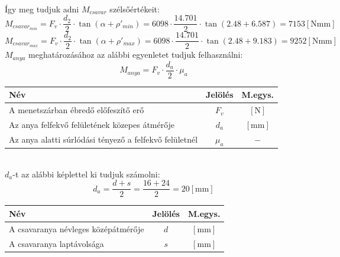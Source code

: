 \documentclass[10pt, a4paper]{article}
\newcommand{\n}{\mathrm{\left[N\right]}}
\newcommand{\mm}{\mathrm{\left[mm\right]}}
\newcommand{\nmm}{\mathrm{\left[Nmm\right]}}
\begin{document}
			\renewcommand{\arraystretch}{1}\\
	\newpage
	Így meg tudjuk adni $M_{csavar}$ szélsőértékeit:
	\begin{equation}
			M_{csavar_{min}} = F_v \cdot \dfrac{d_2}{2} \cdot \tan(\alpha + \rho'_{min}) = 6098 \cdot \dfrac{14.701}{2} \cdot \tan(2.48 + 6.587) = 7153 \nmm\tag{5.1}
	\end{equation}
	\begin{equation}
			M_{csavar_{max}} = F_v \cdot \dfrac{d_2}{2} \cdot \tan(\alpha + \rho'_{max}) = 6098 \cdot \dfrac{14.701}{2} \cdot \tan(2.48 + 9.183) = 9252 \nmm\tag{5.1} \label{Mcsavar}
	\end{equation}
	$M_{anya}$ meghatározásához az alábbi egyenletet tudjuk felhasználni:
	\begin{equation}
		M_{anya} = F_v \cdot \dfrac{d_a}{2} \cdot \mu_a \tag{5.2}
	\end{equation}
	\vspace{-20pt}
		\renewcommand{\arraystretch}{1.4}
							\begin{table}[!h]
								\centering
								\begin{tabular}{l|c|c}
									\textbf{Név}                              & \textbf{Jelölés} & \textbf{M.egys.} \\ \hline
									A menetszárban ébredő előfeszítő erő                     & $F_v$                & $\n$          \\
									Az anya felfekvő felületének közepes átmérője          & $d_a$                & $\mm$			 \\
									Az anya alatti súrlódási tényező a felfekvő felületnél           & $\mu_a$                & $-$			 	       
								\end{tabular}
							\end{table}
		\renewcommand{\arraystretch}{1}\\
	$d_a$-t az alábbi képlettel ki tudjuk számolni:
	\begin{equation}
		d_a = \dfrac{d + s}{2} = \dfrac{16 + 24}{2} = 20 \mm\tag{5.2.1}
	\end{equation}
	\vspace{-20pt}
			\renewcommand{\arraystretch}{1.4}
								\begin{table}[!h]
									\centering
									\begin{tabular}{l|c|c}
										\textbf{Név}                              & \textbf{Jelölés} & \textbf{M.egys.} \\ \hline
										A csavaranya névleges középátmérője                     & $d$                & $\mm$          \\
										A csavaranya laptávolsága          & $s$                & $\mm$			 		 	       
									\end{tabular}
								\end{table}
\end{document}
